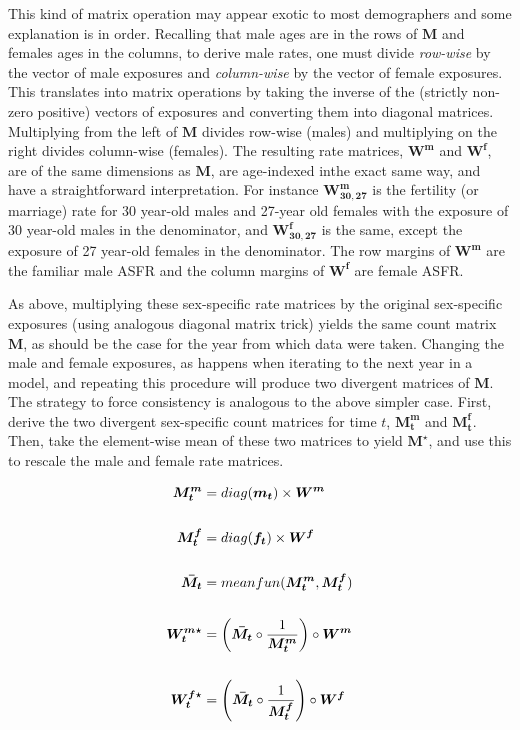 \documentclass[reqno,12pt,oneside,a4paper]{report} %
\theoremstyle{plain}
\theoremstyle{definition}
\theoremstyle{remark}
\numberwithin{theorem}{chapter}     %
\begin{document}
This kind of matrix operation may appear exotic to most demographers and some explanation is in order. Recalling that male ages are in the rows of $\bm{M}$ and females ages in the columns, to derive male rates, one must divide \textit{row-wise} by the vector of male exposures and \textit{column-wise} by the vector of female exposures. This translates into matrix operations by taking the inverse of the (strictly non-zero positive) vectors of exposures and converting them into diagonal matrices. Multiplying from the left of $\bm{M}$ divides row-wise (males) and multiplying on the right divides column-wise (females). The resulting rate matrices, $\bm{W^m}$ and $\bm{W^f}$, are of the same dimensions as $\bm{M}$, are age-indexed inthe exact same way, and have a straightforward interpretation. For instance $\bm{W_{30,27}^m}$ is the fertility (or marriage) rate for 30 year-old males and 27-year old females with the exposure of 30 year-old males in the denominator, and $\bm{W_{30,27}^f}$ is the same, except the exposure of 27 year-old females in the denominator. The row margins of $\bm{W^m}$ are the familiar male ASFR and the column margins of $\bm{W^f}$ are female ASFR.

As above, multiplying these sex-specific rate matrices by the original sex-specific exposures (using analogous diagonal matrix trick) yields the same count matrix $\bm{M}$, as should be the case for the year from which data were taken. Changing the male and female exposures, as happens when iterating to the next year in a model, and repeating this procedure will produce two divergent matrices of $\bm{M}$. The strategy to force consistency is analogous to the above simpler case. First, derive the two divergent sex-specific count matrices for time $t$, $\bm{M_t^m}$ and $\bm{M_t^f}$. Then, take the element-wise mean of these two matrices to yield $\bm{M^{\star}}$, and use this to rescale the male and female rate matrices. 

\begin{align}
\bm{M_{t}^{m}} &= diag(\bm{m_t}) \times \bm{W^m} \notag \\ \notag \\
\bm{M_{t}^{f}} &= diag(\bm{f_t}) \times \bm{W^f} \\ \notag \\
\bm{\bar{M_{t}}} &= meanfun(\bm{M_{t}^{m}},\bm{M_{t}^{f}}) \\ \notag \\
\bm{W_t^{m\star}} &= \left(\bm{\bar{M_{t}}} \circ \frac{1}{\bm{M_{t}^{m}}}\right) \circ \bm{W^m} \notag \\ \notag \\
\bm{W_t^{f\star}} &= \left(\bm{\bar{M_{t}}} \circ \frac{1}{\bm{M_{t}^{f}}}\right) \circ \bm{W^f}
\end{align}
\end{document}
